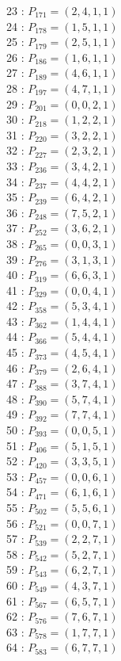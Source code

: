 \documentclass{article}
\begin{document}
{\begin{multicols}{3}
23 : $P_{171}=( 2, 4, 1, 1 )$\\
24 : $P_{178}=( 1, 5, 1, 1 )$\\
25 : $P_{179}=( 2, 5, 1, 1 )$\\
26 : $P_{186}=( 1, 6, 1, 1 )$\\
27 : $P_{189}=( 4, 6, 1, 1 )$\\
28 : $P_{197}=( 4, 7, 1, 1 )$\\
29 : $P_{201}=( 0, 0, 2, 1 )$\\
30 : $P_{218}=( 1, 2, 2, 1 )$\\
31 : $P_{220}=( 3, 2, 2, 1 )$\\
32 : $P_{227}=( 2, 3, 2, 1 )$\\
33 : $P_{236}=( 3, 4, 2, 1 )$\\
34 : $P_{237}=( 4, 4, 2, 1 )$\\
35 : $P_{239}=( 6, 4, 2, 1 )$\\
36 : $P_{248}=( 7, 5, 2, 1 )$\\
37 : $P_{252}=( 3, 6, 2, 1 )$\\
38 : $P_{265}=( 0, 0, 3, 1 )$\\
39 : $P_{276}=( 3, 1, 3, 1 )$\\
40 : $P_{319}=( 6, 6, 3, 1 )$\\
41 : $P_{329}=( 0, 0, 4, 1 )$\\
42 : $P_{358}=( 5, 3, 4, 1 )$\\
43 : $P_{362}=( 1, 4, 4, 1 )$\\
44 : $P_{366}=( 5, 4, 4, 1 )$\\
45 : $P_{373}=( 4, 5, 4, 1 )$\\
46 : $P_{379}=( 2, 6, 4, 1 )$\\
47 : $P_{388}=( 3, 7, 4, 1 )$\\
48 : $P_{390}=( 5, 7, 4, 1 )$\\
49 : $P_{392}=( 7, 7, 4, 1 )$\\
50 : $P_{393}=( 0, 0, 5, 1 )$\\
51 : $P_{406}=( 5, 1, 5, 1 )$\\
52 : $P_{420}=( 3, 3, 5, 1 )$\\
53 : $P_{457}=( 0, 0, 6, 1 )$\\
54 : $P_{471}=( 6, 1, 6, 1 )$\\
55 : $P_{502}=( 5, 5, 6, 1 )$\\
56 : $P_{521}=( 0, 0, 7, 1 )$\\
57 : $P_{539}=( 2, 2, 7, 1 )$\\
58 : $P_{542}=( 5, 2, 7, 1 )$\\
59 : $P_{543}=( 6, 2, 7, 1 )$\\
60 : $P_{549}=( 4, 3, 7, 1 )$\\
61 : $P_{567}=( 6, 5, 7, 1 )$\\
62 : $P_{576}=( 7, 6, 7, 1 )$\\
63 : $P_{578}=( 1, 7, 7, 1 )$\\
64 : $P_{583}=( 6, 7, 7, 1 )$\\
\end{multicols}


}
\end{document}
